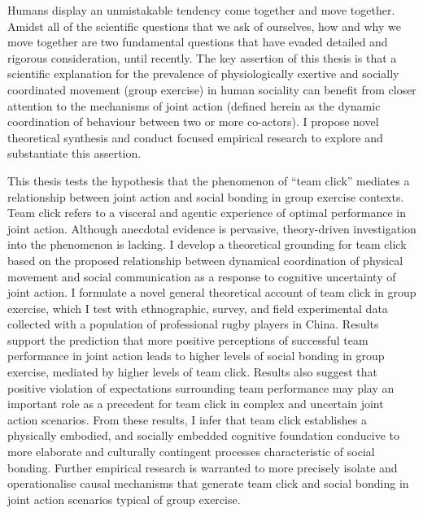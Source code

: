 Humans display an unmistakable tendency come together and move together.  Amidst all of the scientific questions that we ask of ourselves, how and why we move together are two fundamental questions that have evaded detailed and rigorous consideration, until recently.  The key assertion of this thesis is that a scientific explanation for the prevalence of physiologically exertive and socially coordinated movement (group exercise) in human sociality can benefit from closer attention to the mechanisms of joint action (defined herein as the dynamic coordination of behaviour between two or more co-actors).  I propose novel theoretical synthesis and conduct focused empirical research to explore and substantiate this assertion.

This thesis tests the hypothesis that the phenomenon of ``team click'' mediates a relationship between joint action and social bonding in group exercise contexts.  Team click refers to a visceral and agentic experience of optimal performance in joint action.  Although anecdotal evidence is pervasive, theory-driven investigation into the phenomenon is lacking.  I develop a theoretical grounding for team click based on the proposed relationship between dynamical coordination of physical movement and social communication as a response to cognitive uncertainty of joint action.  I formulate a novel general theoretical account of team click in group exercise, which I test with ethnographic, survey, and field experimental data collected with a population of professional rugby players in China.  Results support the prediction that more positive perceptions of successful team performance in joint action leads to higher levels of social bonding in group exercise, mediated by higher levels of team click.  Results also suggest that positive violation of expectations surrounding team performance may play an important role as a precedent for team click in complex and uncertain joint action scenarios.  From these results, I infer that team click establishes a physically embodied, and socially embedded cognitive foundation conducive to more elaborate and culturally contingent processes characteristic of social bonding.  Further empirical research is warranted to more precisely isolate and operationalise causal mechanisms that generate team click and social bonding in joint action scenarios typical of group exercise.



